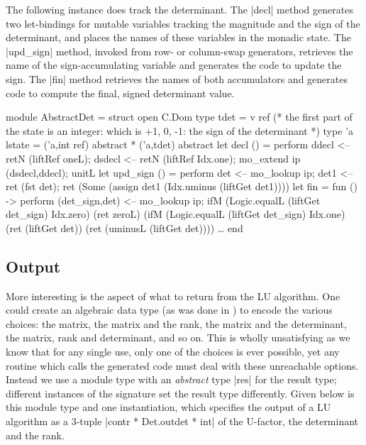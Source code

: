 \documentclass[draft]{elsart}
\begin{document}
The following instance does track the determinant. The |decl| method
generates two let-bindings for mutable variables tracking the
magnitude and the sign of the determinant, and places the names of
these variables in the monadic state. The |upd_sign| method, invoked
from row- or column-swap generators, retrieves the name of the
sign-accumulating variable and generates the code to update the
sign. The |fin| method retrieves the names of both accumulators and
generates code to compute the final, signed determinant value.
\begin{code}
module AbstractDet =
  struct
  open C.Dom
  type tdet = v ref
  (* the first part of the state is an integer: which is +1, 0, -1:
     the sign of the determinant *)
  type 'a lstate = ('a,int ref) abstract * ('a,tdet) abstract
  let decl () = perform
      ddecl <-- retN (liftRef oneL);
      dsdecl <-- retN (liftRef Idx.one);
      mo_extend ip (dsdecl,ddecl);
      unitL
  let upd_sign () = perform
      det <-- mo_lookup ip;
      det1 <-- ret (fst det);
      ret (Some (assign det1 (Idx.uminus (liftGet det1))))
  let fin = fun () -> perform
      (det_sign,det) <-- mo_lookup ip;
      ifM (Logic.equalL (liftGet det_sign) Idx.zero) (ret zeroL)
      (ifM (Logic.equalL (liftGet det_sign) Idx.one) (ret (liftGet det))
          (ret (uminusL (liftGet det))))
  \dots
end
\end{code}


\subsection{Output}

More interesting is the aspect of what to return
from the LU algorithm.  One could create an algebraic data type (as
was done in \cite{Carette06}) to encode the various choices: the
matrix, the matrix and the rank, the matrix and the determinant, the
matrix, rank and determinant, and so on. This is wholly unsatisfying
as we know that for any single use, only one of the choices is ever
possible, yet any routine which calls the generated code must deal
with these unreachable options.  Instead we use a module type with an
\emph{abstract} type |res| for the result type; different instances of
the signature set the result type differently. Given below is this
module type and one instantiation, which specifies the output of a LU
algorithm as a 3-tuple |contr * Det.outdet * int| of the U-factor, the
determinant and the rank.
\end{document}
